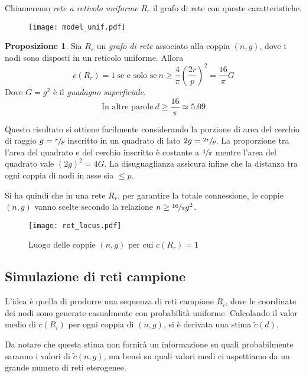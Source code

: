 \documentclass[a4paper,12pt]{article}
\theoremstyle{definition}
\newtheorem{proposition}{Proposizione}
\begin{document}
Chiameremo \emph{rete a reticolo uniforme} $R_r$ il grafo di rete con queste caratteristiche.

\begin{figure}[H]
\centering
\texttt{[image: model\_unif.pdf]}
\caption{}
\end{figure}

\begin{proposition}
Sia $R_r$ un \emph{grafo di rete} associato alla coppia $(n, g)$, dove i nodi sono disposti in un reticolo uniforme. Allora
\begin{displaymath}
c(R_r) = 1 \ \text{se e solo se} \ n \geq \frac{4}{\pi} \left(\frac{2r}{p}\right)^2 = \frac{16}{\pi} G
\end{displaymath}
Dove $G = g^2$ è il \emph{guadagno superficiale}.
\begin{displaymath}
\text{In altre parole} \ d \geq \frac{16}{\pi} \simeq 5.09
\end{displaymath}
\end{proposition}

Questo risultato si ottiene facilmente considerando la porzione di area del cerchio di raggio $g = \sfrac{r}{p}$ inscritto in un quadrato di lato $2g = \sfrac{2r}{p}$. La proporzione tra l'area del quadrato e del cerchio inscritto è costante a $\sfrac{4}{\pi}$ mentre l'area del quadrato vale $(2g)^2 = 4G$. La disuguaglianza assicura infine che la distanza tra ogni coppia di nodi in asse sia $\leq p$.

Si ha quindi che in una rete $R_r$, per garantire la totale connessione, le coppie $(n, g)$ vanno scelte secondo la relazione $n \geq \sfrac{16}{\pi} g^2$.

\begin{figure}[H]
\centering
\texttt{[image: ret\_locus.pdf]}
\caption{Luogo delle coppie $(n, g)$ per cui $c(R_r) = 1$}
\end{figure}

\subsection{Simulazione di reti campione}

L'idea è quella di produrre una sequenza di reti campione $R_i$, dove le coordinate dei nodi sono generate casualmente con probabilità uniforme. Calcolando il valor medio di $c(R_i)$ per ogni coppia di $(n, g)$, si è derivata una stima $\tilde{c}(d)$.

Da notare che questa stima non fornirà un informazione su quali probabilmente saranno i valori di $\tilde{c}(n, g)$, ma bensì su quali valori medi ci aspettiamo da un grande numero di reti eterogenee.
\end{document}
